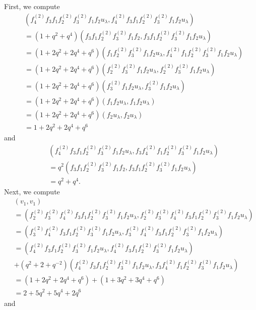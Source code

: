 \documentclass[final]{amsart}
\theoremstyle{plain}
\theoremstyle{definition}
\begin{document}
First, we compute
\begin{align*}
    & (f_4^{(2)} f_3 f_1 f_2^{(2)} f_3^{(2)} f_1 f_2 u_\lambda, f_4^{(2)} f_3 f_1 f_2^{(2)} f_3^{(2)} f_1 f_2 u_\lambda) \\
    &= (1+q^2+q^4) (f_3 f_1 f_2^{(2)} f_3^{(2)} f_1 f_2, f_3 f_1 f_2^{(2)} f_3^{(2)} f_1 f_2 u_\lambda) \\
    &= (1+2q^2+2q^4+q^6) (f_1 f_2^{(2)} f_3^{(2)} f_1 f_2 u_\lambda, f_4^{(2)} f_1 f_2^{(2)} f_3^{(2)} f_1 f_2 u_\lambda) \\
    &= (1+2q^2+2q^4+q^6) (f_2^{(2)} f_3^{(2)} f_1 f_2 u_\lambda, f_2^{(2)} f_3^{(2)} f_1 f_2 u_\lambda) \\
    &= (1+2q^2+2q^4+q^6) (f_3^{(2)} f_1 f_2 u_\lambda, f_3^{(2)} f_1 f_2 u_\lambda) \\
    &= (1+2q^2+2q^4+q^6) (f_1 f_2 u_\lambda, f_1 f_2 u_\lambda) \\
    &= (1+2q^2+2q^4+q^6) (f_2 u_\lambda, f_2 u_\lambda) \\
    &= 1+2q^2+2q^4+q^6
\end{align*}
and
\begin{align*}
    & (f_4^{(2)} f_3 f_1 f_2^{(2)} f_3^{(2)} f_1 f_2 u_\lambda, f_3 f_4^{(2)} f_1 f_2^{(2)} f_3^{(2)} f_1 f_2 u_\lambda) \\
    &= q^2 (f_3 f_1 f_2^{(2)} f_3^{(2)} f_1 f_2, f_3 f_1 f_2^{(2)} f_3^{(2)} f_1 f_2 u_\lambda) \\
    &= q^2+q^4.
\end{align*}
Next, we compute
\begin{align*}
    & (v_1, v_1) \\
    &= (f_2^{(2)} f_3^{(2)} f_4^{(2)} f_3 f_1 f_2^{(2)} f_3^{(2)} f_1 f_2 u_\lambda, f_2^{(2)} f_3^{(2)} f_4^{(2)} f_3 f_1 f_2^{(2)} f_3^{(2)} f_1 f_2 u_\lambda) \\
    &= (f_3^{(2)} f_4^{(2)} f_3 f_1 f_2^{(2)} f_3^{(2)} f_1 f_2 u_\lambda, f_3^{(2)} f_4^{(2)} f_3 f_1 f_2^{(2)} f_3^{(2)} f_1 f_2 u_\lambda) \\
    &= (f_4^{(2)} f_3 f_1 f_2^{(2)} f_3^{(2)} f_1 f_2 u_\lambda, f_4^{(2)} f_3 f_1 f_2^{(2)} f_3^{(2)} f_1 f_2 u_\lambda) \\
    &+ (q^2 + 2 + q^{-2}) (f_4^{(2)} f_3 f_1 f_2^{(2)} f_3^{(2)} f_1 f_2 u_\lambda, f_3 f_4^{(2)} f_1 f_2^{(2)} f_3^{(2)} f_1 f_2 u_\lambda) \\
    &= (1+2q^2+2q^4+q^6) + (1+3q^2+3q^4+q^6) \\
    &= 2 + 5q^2 + 5q^4 + 2q^6
\end{align*}
and
\end{document}
